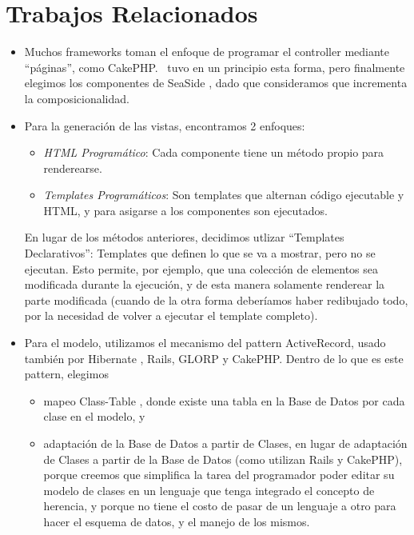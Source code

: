 \section{Trabajos Relacionados}

\begin{itemize}
\item Muchos frameworks toman el enfoque de programar el controller mediante ``páginas'', como CakePHP. \PWB\ tuvo en un principio esta forma, pero finalmente elegimos los componentes de SeaSide \cite{seaside,Duca04e}, dado que consideramos que incrementa la composicionalidad.


\item Para la generación de las vistas, encontramos 2 enfoques:
\begin{itemize}
\item \emph{HTML Programático}: Cada componente tiene un método propio para renderearse.
\item \emph{Templates Programáticos}: Son templates que alternan código ejecutable y HTML, y para asigarse a los componentes son ejecutados.
\end{itemize}
En lugar de los métodos anteriores, decidimos utlizar ``Templates Declarativos'': Templates que definen lo que se va a mostrar, pero no se ejecutan. Esto permite, por ejemplo, que una colección de elementos sea modificada durante la ejecución, y de esta manera solamente renderear la parte modificada (cuando de la otra forma deberíamos haber redibujado todo, por la necesidad de volver a ejecutar el template completo).


\item Para el modelo, utilizamos el mecanismo del pattern ActiveRecord, usado también por Hibernate \cite{hibernate}, Rails, GLORP y CakePHP. Dentro de lo que es este pattern, elegimos
\begin{itemize}
\item mapeo Class-Table \cite{classtable}, donde existe una tabla en la Base de Datos por cada clase en el modelo, y
\item adaptación de la Base de Datos a partir de Clases, en lugar de adaptación de Clases a partir de la Base de Datos (como utilizan Rails y CakePHP), porque creemos que simplifica la tarea del programador poder editar su modelo de clases en un lenguaje que tenga integrado el concepto de herencia, y porque no tiene el costo de pasar de un lenguaje a otro para hacer el esquema de datos, y el manejo de los mismos.
\end{itemize}


\end{itemize}
